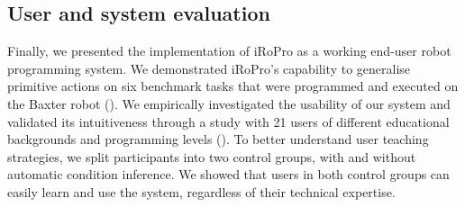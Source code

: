 \subsection{User and system evaluation}
Finally, we presented the implementation of iRoPro as a working end-user robot programming system.
We demonstrated iRoPro's capability to generalise primitive actions on six benchmark tasks that were programmed and executed on the Baxter robot ().
We empirically investigated the usability of our system and validated its intuitiveness through a study with 21 users of different educational backgrounds and programming levels
().
To better understand user teaching strategies, we split participants into two control groups, with and without automatic condition inference.
We showed that users in both control groups can easily learn and use the system, regardless of their technical expertise.





